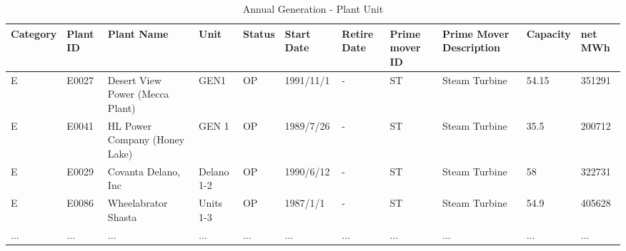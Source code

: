 \begin{table*}[!ht]
	\setlength\extrarowheight{2pt} %
	\begin{tabular}{ |l|p{1cm}|p{2cm}|p{1cm}|l|p{2cm}|p{1cm}|p{2cm}|p{2cm}|p{1cm}|p{1cm}|  }
		\hline
		Category& 	Plant ID& 	Plant Name& 	Unit& 	Status& 	Start Date& 	Retire Date& 	Prime mover ID& Prime Mover Description& Capacity& net MWh\\
		\hline
		 E& E0027& 	Desert View Power (Mecca Plant)& 	GEN1& 	OP& 	1991/11/1& 	-	&ST& 	Steam Turbine& 	54.15& 	351291\\
		 \hline
		 E & 	E0041& 	HL Power Company (Honey Lake)& 	GEN 1& 	OP& 	1989/7/26& 	-	&ST& 	Steam Turbine& 	35.5& 	200712\\
		 \hline
		 E& E0029& 	Covanta Delano, Inc& 	Delano 1-2& 	OP& 	1990/6/12& 	- &ST& 	Steam Turbine& 	58& 	322731\\
		 \hline
		 E& 	E0086& 	Wheelabrator Shasta& 	Units 1-3& 	OP& 	1987/1/1& 	-	&ST& 	Steam Turbine& 	54.9& 	405628\\
		 \hline
		 ... & ... & ... & ... & ... & ... & ... & ... & ... & ... & ... \\
		 
		\hline
		
		
	\end{tabular}
	\vspace{.2cm}
	\caption{Annual Generation - Plant Unit\label{tab:q1-result2}}
\end{table*}


